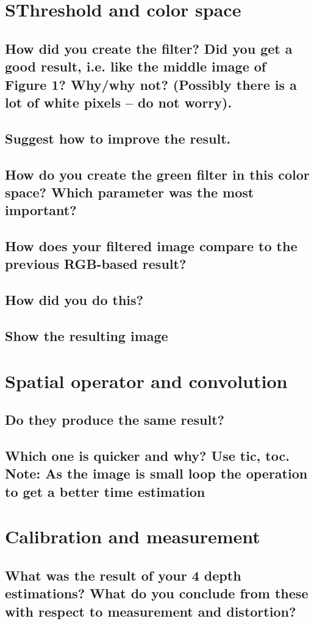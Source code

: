 \section{SThreshold and color space}
\subsection{How did you create the filter? Did you get a good result, i.e. like the middle image of Figure 1? Why/why not? (Possibly there is a lot of white pixels – do not worry).}
\subsection{Suggest how to improve the result.}
\subsection{How do you create the green filter in this color space? Which parameter was the most important?}
\subsection{How does your filtered image compare to the previous RGB-based result?}
\subsection{How did you do this?}
\subsection{Show the resulting image}
\section{Spatial operator and convolution}
\subsection{Do they produce the same result?}
\subsection{Which one is quicker and why? Use tic, toc. Note: As the image is small loop the operation to get a better time estimation}
\section{Calibration and measurement}
\subsection{What was the result of your 4 depth estimations? What do you conclude from these with respect to measurement and distortion?}
\section{}